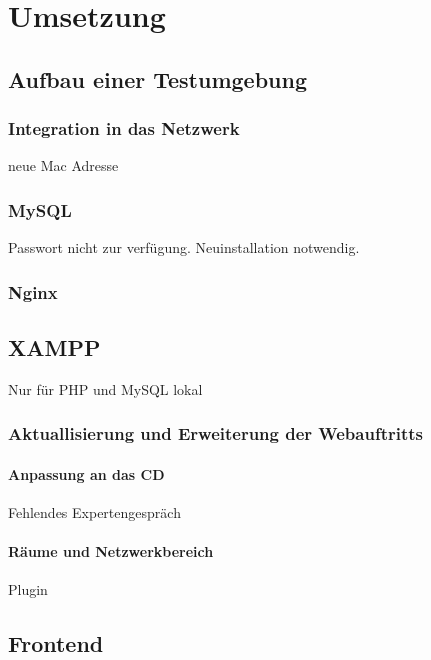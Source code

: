 \chapter{Umsetzung}

\section{Aufbau einer Testumgebung}
\label{sec:integration_ace}

\subsection{Integration in das Netzwerk}
neue Mac Adresse

\subsection{MySQL}
Passwort nicht zur verfügung. Neuinstallation notwendig.

\subsection{Nginx}

\section{XAMPP}
Nur für PHP und MySQL lokal 





\subsection{Aktuallisierung und Erweiterung der Webauftritts}
\label{subsec:webauftritt}

\subsubsection{Anpassung an das CD}
Fehlendes Expertengespräch

\subsubsection{Räume und Netzwerkbereich}

Plugin

\section{Frontend}

